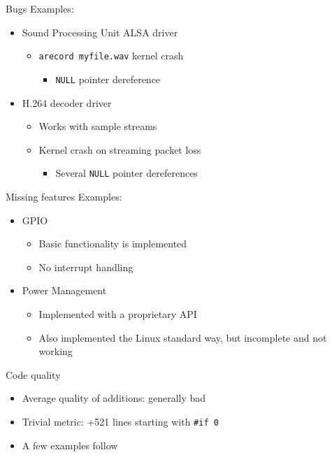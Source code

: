 \documentclass[xetex,table,aspectratio=169]{beamer}
\begin{document}
\begin{frame}{Bugs}
  Examples:
  \begin{itemize}
  \item Sound Processing Unit ALSA driver
    \begin{itemize}
    \item \texttt{arecord myfile.wav} \textrightarrow{} kernel crash
      \begin{itemize}
      \item \texttt{NULL} pointer dereference
      \end{itemize}
    \end{itemize}
  \item H.264 decoder driver
    \begin{itemize}
    \item Works with sample streams
    \item Kernel crash on streaming packet loss
      \begin{itemize}
      \item Several \texttt{NULL} pointer dereferences
      \end{itemize}
    \end{itemize}
  \end{itemize}
\end{frame}

\begin{frame}{Missing features}
  Examples:
  \begin{itemize}
  \item GPIO
    \begin{itemize}
    \item Basic functionality is implemented
    \item No interrupt handling
    \end{itemize}
  \item Power Management
    \begin{itemize}
    \item Implemented with a proprietary API
    \item Also implemented the Linux standard way, but incomplete and
      not working
    \end{itemize}
  \end{itemize}
\end{frame}

\begin{frame}{Code quality}
  \begin{itemize}
  \item Average quality of additions: generally bad
  \item Trivial metric: +521 lines starting with \texttt{\#if 0}
  \item A few examples follow
  \end{itemize}
\end{frame}
\end{document}
